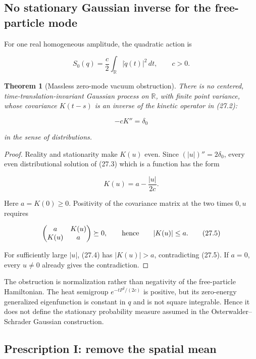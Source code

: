 \documentclass[11pt]{article}
\newtheorem{theorem}{Theorem}[section]
\theoremstyle{remark}
\begin{document}
\subsection{No stationary Gaussian inverse for the free-particle mode}

For one real homogeneous amplitude, the quadratic action is

\[
 S_0(q)=\frac c2\int_{\mathbb R}|\dot q(t)|^2\,dt,
 \qquad c>0.                                                   \tag{27.2}
\]

\begin{theorem}[Massless zero-mode vacuum obstruction]
\label{thm:v19v24-no-vacuum}
There is no centered, time-translation-invariant Gaussian process on
\(\mathbb R\), with finite point variance, whose covariance \(K(t-s)\)
is an inverse of the kinetic operator in (27.2):

\[
 -cK''=\delta_0                                                     \tag{27.3}
\]

in the sense of distributions.
\end{theorem}

\begin{proof}
Reality and stationarity make \(K(u)\) even.  Since
\((|u|)''=2\delta_0\), every even distributional solution of (27.3)
which is a function has the form

\[
 K(u)=a-\frac{|u|}{2c}.                                        \tag{27.4}
\]

Here \(a=K(0)\geq0\).  Positivity of the covariance matrix at the two
times \(0,u\) requires

\[
 \begin{pmatrix}a&K(u)\\K(u)&a\end{pmatrix}\succeq0,
 \qquad\hbox{hence}\qquad |K(u)|\leq a.                         \tag{27.5}
\]

For sufficiently large \(|u|\), (27.4) has
\(|K(u)|>a\), contradicting (27.5).  If \(a=0\), every \(u\neq0\)
already gives the contradiction.
\end{proof}

The obstruction is normalization rather than negativity of the
free-particle Hamiltonian.  The heat semigroup
\(e^{-tP^2/(2c)}\) is positive, but its zero-energy generalized
eigenfunction is constant in \(q\) and is not square integrable.  Hence it
does not define the stationary probability measure assumed in the
Osterwalder--Schrader Gaussian construction.

\subsection{Prescription I: remove the spatial mean}
\end{document}
